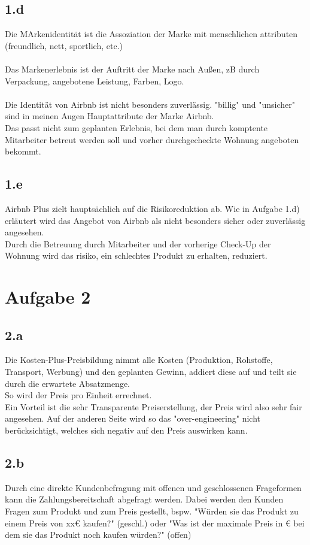 \subsection{1.d}
    Die MArkenidentität ist die Assoziation der Marke mit menschlichen attributen (freundlich, nett, sportlich, etc.) \\
    \ \\
    Das Markenerlebnis ist der Auftritt der Marke nach Außen, zB durch Verpackung, angebotene Leistung, Farben, Logo. \\
    \ \\
    Die Identität von Airbnb ist nicht besonders zuverlässig. "billig" und "unsicher" sind in meinen Augen Hauptattribute der Marke Airbnb. \\
    Das passt nicht zum geplanten Erlebnis, bei dem man durch komptente Mitarbeiter betreut werden soll und vorher durchgecheckte Wohnung angeboten bekommt.

\subsection{1.e}
    Airbnb Plus zielt hauptsächlich auf die Risikoreduktion ab. Wie in Aufgabe 1.d) erläutert wird das Angebot von Airbnb als nicht besonders sicher oder zuverlässig angesehen. \\
    Durch die Betreuung durch Mitarbeiter und der vorherige Check-Up der Wohnung wird das risiko, ein schlechtes Produkt zu erhalten, reduziert.



\section{Aufgabe 2}
\subsection{2.a}
    Die Kosten-Plus-Preisbildung nimmt alle Kosten (Produktion, Rohstoffe, Transport, Werbung) und den geplanten Gewinn, addiert diese auf und teilt sie durch die erwartete Absatzmenge. \\
    So wird der Preis pro Einheit errechnet. \\
    Ein Vorteil ist die sehr Transparente Preiserstellung, der Preis wird also sehr fair angesehen. Auf der anderen Seite wird so das "over-engineering" nicht berücksichtigt, welches sich negativ auf den Preis auswirken kann.

\subsection{2.b}
    Durch eine direkte Kundenbefragung mit offenen und geschlossenen Frageformen kann die Zahlungsbereitschaft abgefragt werden. Dabei werden den Kunden Fragen zum Produkt und zum Preis gestellt,
    bspw. "Würden sie das Produkt zu einem Preis von xx€ kaufen?" (geschl.) oder "Was ist der maximale Preis in € bei dem sie das Produkt noch kaufen würden?" (offen)

